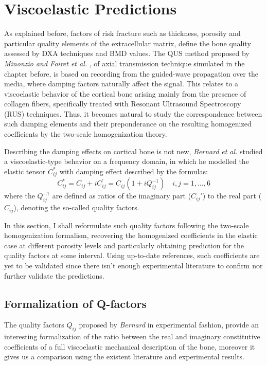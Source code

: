 \chapter{Viscoelastic Predictions}
As explained before, factors of risk fracture such as thickness, porosity and particular quality elements of the extracellular matrix, define the bone quality assessed by DXA techniques and BMD values. The QUS method proposed by \textit{Minonzio and Foiret et al.} \cite{Foiret2014}, \cite{Minonzio2018} of axial transmission technique simulated in the chapter before, is based on recording from the guided-wave propagation over the media, where damping factors naturally affect the signal. This relates to a viscoelastic behavior of the cortical bone arising mainly from the presence of collagen fibers, specifically treated with Resonant Ultrasound Spectroscopy (RUS) techniques. Thus, it becomes natural to study the correspondence between such damping elements and their preponderance on the resulting homogenized coefficients by the two-scale homogenization theory.

Describing the damping effects on cortical bone is not new, \textit{Bernard} \textit{et al. }\cite{Bernard2015} studied a viscoelastic-type behavior on a frequency domain, in which he modelled the elastic tensor $C^*_{ij}$ with damping effect described by the formulas:
\begin{equation*}
C^*_{ij} = C_{ij} + i C_{ij}^{'} = C_{ij} (1+ iQ_{ij}^{-1}) \quad i,j = 1,\dots, 6
\end{equation*}
where the $Q^{-1}_{ij}$ are defined as ratios of the imaginary part ($C_{ij}'$) to the real part ($C_{ij}$), denoting the so-called quality factors.

In this section, I shall reformulate such quality factors following the two-scale homogenization formalism, recovering the homogenized coefficients in the elastic case at different porosity levels and particularly obtaining prediction for the quality factors at some interval. Using up-to-date references, such coefficients are yet to be validated since there isn't enough experimental literature to confirm nor further validate the predictions.

\section{Formalization of Q-factors}
The quality factors $Q_{ij}$ proposed by \textit{Bernard} in experimental fashion, provide an interesting formalization of the ratio between the real and imaginary constitutive coefficients of a full viscoelastic mechanical description of the bone, moreover it gives us a comparison using the existent literature and experimental results.

